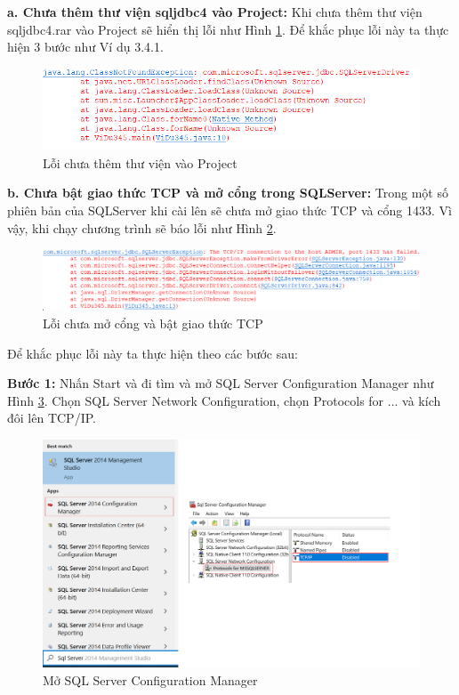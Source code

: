  \textbf{a. Chưa thêm thư viện  sqljdbc4 vào Project:}
Khi chưa thêm thư viện sqljdbc4.rar vào Project sẽ hiển thị lỗi như Hình \ref{hinh33_1}. Để khắc phục lỗi này ta thực hiện 3 bước như Ví dụ 3.4.1.
  	\begin{figure}[!ht]
  	\centering
  	\includegraphics[scale=0.6]{Figures//Hinh33_1.png}
  	\caption{ Lỗi chưa thêm thư viện vào Project  }\label{hinh33_1} 
  \end{figure}

 \textbf{b. Chưa bật giao thức TCP và mở cổng trong SQLServer:} Trong một số phiên bản của SQLServer khi cài lên sẽ chưa mở giao thức TCP và cổng 1433. Vì vậy, khi chạy  chương trình sẽ báo lỗi như Hình \ref{hinh33_2}.
 
	\begin{figure}[ht]
	\centering
	\includegraphics[scale=0.55]{Figures//Hinh33_2.png}
	\caption{ Lỗi chưa mở cổng và bật giao thức TCP  }\label{hinh33_2} 
	\end{figure}
Để khắc phục lỗi này ta thực hiện theo các bước sau:

   \textbf{Bước 1:} Nhấn Start và đi tìm và mở SQL Server Configuration Manager như Hình \ref{hinh33_3}.  Chọn SQL Server Network Configuration, chọn Protocols for ... và kích đôi lên TCP/IP.
   	\begin{figure}[ht]
   	\centering
   	\includegraphics[scale=0.5]{Figures//Hinh33_3.png}
   	\caption{ Mở SQL Server Configuration Manager  }\label{hinh33_3} 
   \end{figure}


